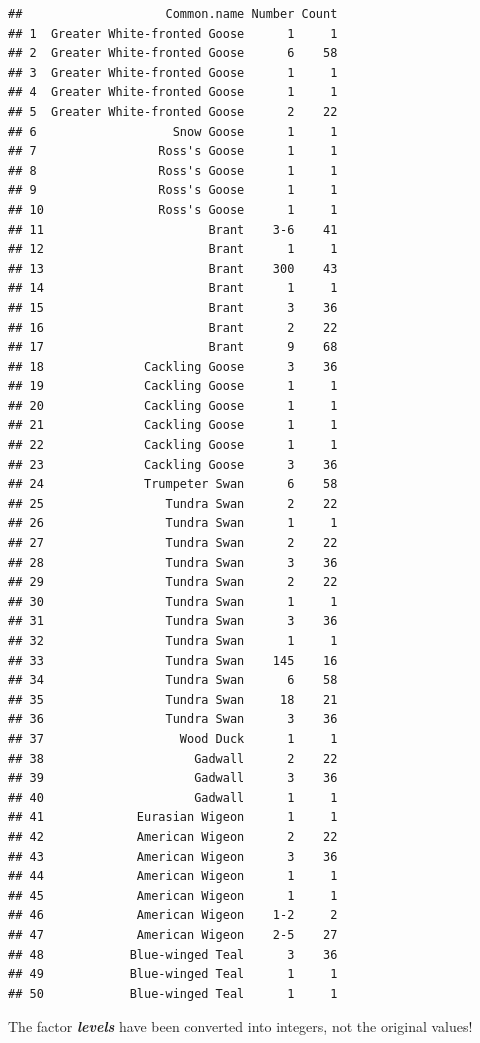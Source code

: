 \documentclass[]{book}
\begin{document}
\begin{verbatim}
##                    Common.name Number Count
## 1  Greater White-fronted Goose      1     1
## 2  Greater White-fronted Goose      6    58
## 3  Greater White-fronted Goose      1     1
## 4  Greater White-fronted Goose      1     1
## 5  Greater White-fronted Goose      2    22
## 6                   Snow Goose      1     1
## 7                 Ross's Goose      1     1
## 8                 Ross's Goose      1     1
## 9                 Ross's Goose      1     1
## 10                Ross's Goose      1     1
## 11                       Brant    3-6    41
## 12                       Brant      1     1
## 13                       Brant    300    43
## 14                       Brant      1     1
## 15                       Brant      3    36
## 16                       Brant      2    22
## 17                       Brant      9    68
## 18              Cackling Goose      3    36
## 19              Cackling Goose      1     1
## 20              Cackling Goose      1     1
## 21              Cackling Goose      1     1
## 22              Cackling Goose      1     1
## 23              Cackling Goose      3    36
## 24              Trumpeter Swan      6    58
## 25                 Tundra Swan      2    22
## 26                 Tundra Swan      1     1
## 27                 Tundra Swan      2    22
## 28                 Tundra Swan      3    36
## 29                 Tundra Swan      2    22
## 30                 Tundra Swan      1     1
## 31                 Tundra Swan      3    36
## 32                 Tundra Swan      1     1
## 33                 Tundra Swan    145    16
## 34                 Tundra Swan      6    58
## 35                 Tundra Swan     18    21
## 36                 Tundra Swan      3    36
## 37                   Wood Duck      1     1
## 38                     Gadwall      2    22
## 39                     Gadwall      3    36
## 40                     Gadwall      1     1
## 41             Eurasian Wigeon      1     1
## 42             American Wigeon      2    22
## 43             American Wigeon      3    36
## 44             American Wigeon      1     1
## 45             American Wigeon      1     1
## 46             American Wigeon    1-2     2
## 47             American Wigeon    2-5    27
## 48            Blue-winged Teal      3    36
## 49            Blue-winged Teal      1     1
## 50            Blue-winged Teal      1     1
\end{verbatim}

The factor \textbf{\emph{levels}} have been converted into integers, not the original values!
\end{document}
